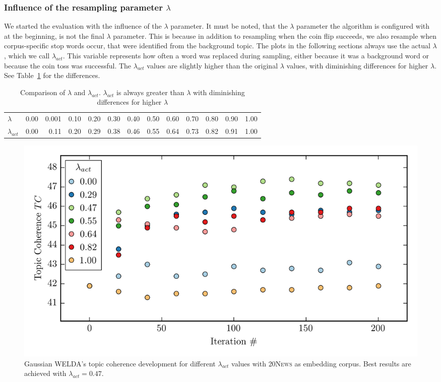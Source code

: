 \documentclass[
        a4paper,
        titlepage,
        twoside,
        parskip,
        numbers=noenddot
        ]{scrbook}
\newcommand{\ra}[1]{\renewcommand{\arraystretch}{#1}}
\theoremstyle{break}
\begin{document}
\subsubsection{Influence of the resampling parameter $\lambda$}
We started the evaluation with the influence of the $\lambda$ parameter.
It must be noted, that the $\lambda$ parameter the algorithm is configured with at the beginning, is not the final $\lambda$ parameter.
This is because in addition to resampling when the coin flip succeeds, we also resample when corpus-specific stop words occur, that were identified from the background topic.
The plots in the following sections always use the actual $\lambda$, which we call $\lambda_{act}$.
This variable represents how often a word was replaced during sampling, either because it was a background word or because the coin toss was successful.
The $\lambda_{act}$ values are slightly higher than the original $\lambda$ values, with diminishing differences for higher $\lambda$. See Table~\ref{table:actual_lambda} for the differences.
\begin{table}[]
  \ra{1.2}
  \centering
  \caption{Comparison of $\lambda$ and $\lambda_{act}$. $\lambda_{act}$ is always greater than $\lambda$ with diminishing differences for higher $\lambda$}
  \label{table:actual_lambda}
  \begin{tabular}{lrrrrrrrrrrrr}
    \toprule
    $\lambda$     & 0.00 & 0.001 & 0.10  & 0.20  & 0.30  & 0.40  & 0.50  & 0.60  & 0.70  & 0.80  & 0.90  & 1.00 \\
    $\lambda_{act}$ & 0.00 & 0.11  & 0.20 & 0.29 & 0.38 & 0.46 & 0.55 & 0.64 & 0.73 & 0.82 & 0.91 & 1.00 \\
    \bottomrule
  \end{tabular}
\end{table}

\begin{figure}
       \centering
       \includegraphics[width=\textwidth]{figures/welda_gaussian_lambda_20news.png}
       \caption{Gaussian WELDA's topic coherence development for different $\lambda_{act}$ values with \textsc{20News} as embedding corpus.
       Best results are achieved with $\lambda_{act} = 0.47$.}
       \label{fig:welda_gaussian_lambda_20news}
\end{figure}
\end{document}
